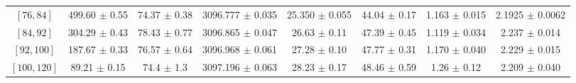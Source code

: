 \begin{tabular}{c||c|c|c|c|c|c|c}
$[76, 84]$ & 499.60 $\pm$ 0.55 & 74.37 $\pm$ 0.38 & 3096.777 $\pm$ 0.035 & 25.350 $\pm$ 0.055 & 44.04 $\pm$ 0.17 & 1.163 $\pm$ 0.015 & 2.1925 $\pm$ 0.0062\\
$[84, 92]$ & 304.29 $\pm$ 0.43 & 78.43 $\pm$ 0.77 & 3096.865 $\pm$ 0.047 & 26.63 $\pm$ 0.11 & 47.39 $\pm$ 0.45 & 1.119 $\pm$ 0.034 & 2.237 $\pm$ 0.014\\
$[92, 100]$ & 187.67 $\pm$ 0.33 & 76.57 $\pm$ 0.64 & 3096.968 $\pm$ 0.061 & 27.28 $\pm$ 0.10 & 47.77 $\pm$ 0.31 & 1.170 $\pm$ 0.040 & 2.229 $\pm$ 0.015\\
$[100, 120]$ & 89.21 $\pm$ 0.15 & 74.4 $\pm$ 1.3 & 3097.196 $\pm$ 0.063 & 28.23 $\pm$ 0.17 & 48.46 $\pm$ 0.59 & 1.26 $\pm$ 0.12 & 2.209 $\pm$ 0.040\\
\end{tabular}
